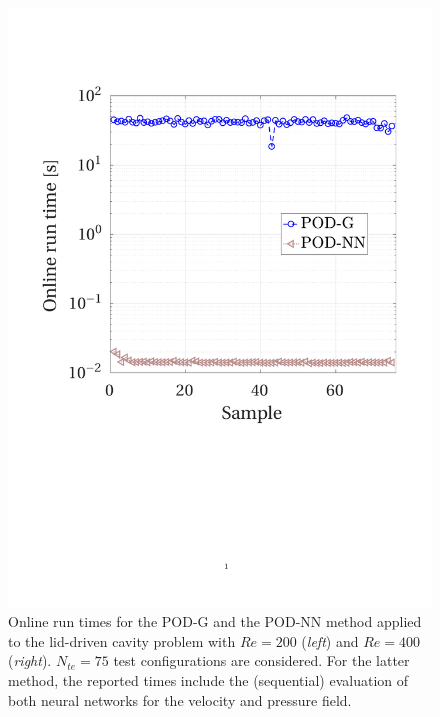 \documentclass[12pt, a4paper, twoside, openright, notitlepage]{report}
\numberwithin{equation}{chapter}
\theoremstyle{theorem}
\theoremstyle{definition}
\theoremstyle{remark}
\theoremstyle{proposition}
\numberwithin{figure}{chapter}
\begin{document}
\begin{figure}[H]
			\includegraphics[scale = 0.37, trim = {1cm 9cm 1.5cm 3.5cm}, clip]{dc_400_time}
			
			\vspace*{-0.1cm}
			
			\caption{Online run times for the POD-G and the POD-NN method applied to the lid-driven cavity problem with $Re = 200$ (\emph{left}) and $Re = 400$ (\emph{right}). $N_{te} = 75$ test configurations are considered. For the latter method, the reported times include the (sequential) evaluation of both neural networks for the velocity and pressure field.}
			\label{fig:dc-time}
		\end{figure}
		
\end{document}

